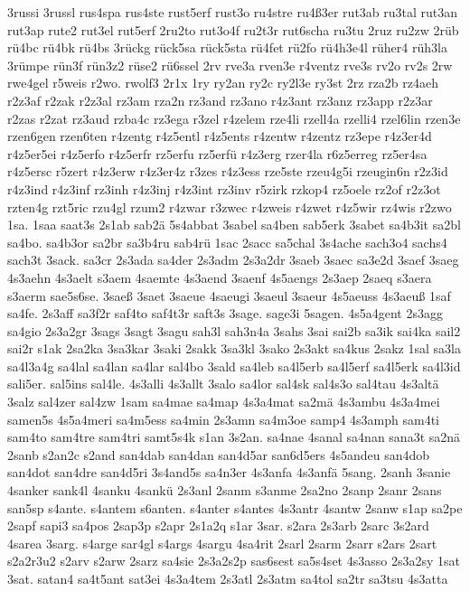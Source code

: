 {3russi
3russl
rus4spa
rus4ste
rust5erf
rust3o
ru4stre
ru4ß3er
rut3ab
ru3tal
rut3an
rut3ap
rute2
rut3el
rut5erf
2ru2to
rut3o4f
ru2t3r
rut6scha
ru3tu
2ruz
ru2zw
2rüb
rü4bc
rü4bk
rü4bs
3rückg
rück5sa
rück5sta
rü4fet
rü2fo
rü4h3e4l
rüher4
rüh3la
3rümpe
rün3f
rün3z2
rüse2
rü6ssel
2rv
rve3a
rven3e
r4ventz
rve3s
rv2o
rv2s
2rw
rwe4gel
r5weis
r2wo.
rwolf3
2r1x
1ry
ry2an
ry2c
ry2l3e
ry3st
2rz
rza2b
rz4aeh
r2z3af
r2zak
r2z3al
rz3am
rza2n
rz3and
rz3ano
r4z3ant
rz3anz
rz3app
r2z3ar
r2zas
r2zat
rz3aud
rzba4c
rz3ega
r3zel
r4zelem
rze4li
rzell4a
rzelli4
rzel6lin
rzen3e
rzen6gen
rzen6ten
r4zentg
r4z5entl
r4z5ents
r4zentw
r4zentz
rz3epe
r4z3er4d
r4z5er5ei
r4z5erfo
r4z5erfr
rz5erfu
rz5erfü
r4z3erg
rzer4la
r6z5erreg
rz5er4sa
r4z5ersc
r5zert
r4z3erw
r4z3er4z
r3zes
r4z3ess
rze5ste
rzeu4g5i
rzeugin6n
r2z3id
r4z3ind
r4z3inf
rz3inh
r4z3inj
r4z3int
rz3inv
r5zirk
rzkop4
rz5oele
rz2of
r2z3ot
rzten4g
rzt5ric
rzu4gl
rzum2
r4zwar
r3zwec
r4zweis
r4zwet
r4z5wir
rz4wis
r2zwo
1sa.
1saa
saat3s
2s1ab
sab2ä
5s4abbat
3sabel
sa4ben
sab5erk
3sabet
sa4b3it
sa2bl
sa4bo.
sa4b3or
sa2br
sa3b4ru
sab4rü
1sac
2sacc
sa5chal
3s4ache
sach3o4
sachs4
sach3t
3sack.
sa3cr
2s3ada
sa4der
2s3adm
2s3a2dr
3saeb
3saec
sa3e2d
3saef
3saeg
4s3aehn
4s3aelt
s3aem
4saemte
4s3aend
3saenf
4s5aengs
2s3aep
2saeq
s3aera
s3aerm
sae5s6se.
3saeß
3saet
3saeue
4saeugi
3saeul
3saeur
4s5aeuss
4s3aeuß
1saf
sa4fe.
2s3aff
sa3f2r
saf4to
saf4t3r
saft3s
3sage.
sage3i
5sagen.
4s5a4gent
2s3agg
sa4gio
2s3a2gr
3sags
3sagt
3sagu
sah3l
sah3n4a
3sahs
3sai
sai2b
sa3ik
sai4ka
sail2
sai2r
s1ak
2sa2ka
3sa3kar
3saki
2sakk
3sa3kl
3sako
2s3akt
sa4kus
2sakz
1sal
sa3la
sa4l3a4g
sa4lal
sa4lan
sa4lar
sal4bo
3sald
sa4leb
sa4l5erb
sa4l5erf
sa4l5erk
sa4l3id
sali5er.
sal5ins
sal4le.
4s3alli
4s3allt
3salo
sa4lor
sal4sk
sal4s3o
sal4tau
4s3altä
3salz
sal4zer
sal4zw
1sam
sa4mae
sa4map
4s3a4mat
sa2mä
4s3ambu
4s3a4mei
samen5s
4s5a4meri
sa4m5ess
sa4min
2s3amn
sa4m3oe
samp4
4s3amph
sam4ti
sam4to
sam4tre
sam4tri
samt5s4k
s1an
3s2an.
sa4nae
4sanal
sa4nan
sana3t
sa2nä
2sanb
s2an2c
s2and
san4dab
san4dan
san4d5ar
san6d5ers
4s5andeu
san4dob
san4dot
san4dre
san4d5ri
3s4and5s
sa4n3er
4s3anfa
4s3anfä
5sang.
2sanh
3sanie
4sanker
sank4l
4sanku
4sankü
2s3anl
2sanm
s3anme
2sa2no
2sanp
2sanr
2sans
san5sp
s4ante.
s4antem
s6anten.
s4anter
s4antes
4s3antr
4santw
2sanw
s1ap
sa2pe
2sapf
sapi3
sa4pos
2sap3p
s2apr
2s1a2q
s1ar
3sar.
s2ara
2s3arb
2sarc
3s2ard
4sarea
3sarg.
s4arge
sar4gl
s4args
4sargu
4sa4rit
2sarl
2sarm
2sarr
s2ars
2sart
s2a2r3u2
s2arv
s2arw
2sarz
sa4sie
2s3a2s2p
sas6sest
sa5s4set
4s3asso
2s3a2sy
1sat
3sat.
satan4
sa4t5ant
sat3ei
4s3a4tem
2s3atl
2s3atm
sa4tol
sa2tr
sa3tsu
4s3atta
}
